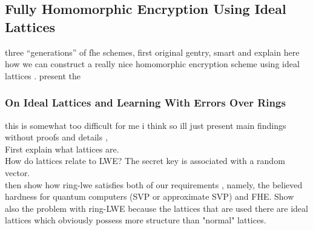 


\subsection{Fully Homomorphic Encryption Using Ideal Lattices}
three ``generations'' of fhe schemes, first original gentry, smart and
explain here how we can construct a really nice homomorphic encryption scheme using ideal lattices \cite{gentry}. present the 
\subsubsection*{On Ideal Lattices and Learning With Errors Over Rings}
this is somewhat too difficult for me i think so ill just present main findings without proofs and details \cite{regev}, \\
First explain what lattices are. \\
How do lattices relate to LWE? The secret key is associated with a random vector. \\
then show how ring-lwe satisfies both of our requirements \cite{ring-lwe}, namely, the believed hardness for quantum computers (SVP or approximate SVP) and FHE. Show also the problem with ring-LWE because the lattices that are used there are ideal lattices which obviously possess more structure than "normal" lattices.
